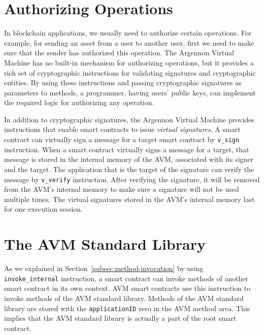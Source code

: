 \section{Authorizing Operations}\label{sec:authorizing-operations}

In blockchain applications, we usually need to authorize certain operations. For example, for sending an asset
from a user to another user, first we need to make sure that the sender has authorized this operation. The
Argennon Virtual Machine has no built-in mechanism for authorizing operations, but it provides a rich set of
cryptographic instructions for validating signatures and cryptographic entities. By using these instructions and
passing cryptographic signatures as parameters to methods, a programmer, having users' public keys, can implement
the required logic for authorizing any operation.


In addition to cryptographic signatures, the Argennon Virtual Machine provides instructions that enable
smart contracts to issue \emph{virtual signatures}. A smart contract can virtually sign a message for a target
smart contract by \texttt{v\_sign} instruction. When a smart contract
virtually signs a message for a target, that message is stored in the internal memory of the AVM, associated with
its signer and the target. The application that is the target of the signature can verify the message
by \texttt{v\_verify} instruction. After verifying the signature, it will be removed from the AVM's internal memory
to make sure a signature will not be used multiple times. The virtual signatures stored in the AVM's internal memory
last for one execution session.



\section{The AVM Standard Library}\label{sec:the-avm-standard-library}

As we explained in Section~\ref{subsec:method-invocation} by using \texttt{invoke\_internal} instruction, a smart
contract can invoke methods of another smart contract in its own context. AVM smart contracts use this instruction to
invoke methods of the AVM standard library. Methods of the AVM standard library are stored
with the \texttt{applicationID} zero in the AVM method area. This implies that the AVM standard library is actually
a part of the root smart contract.

